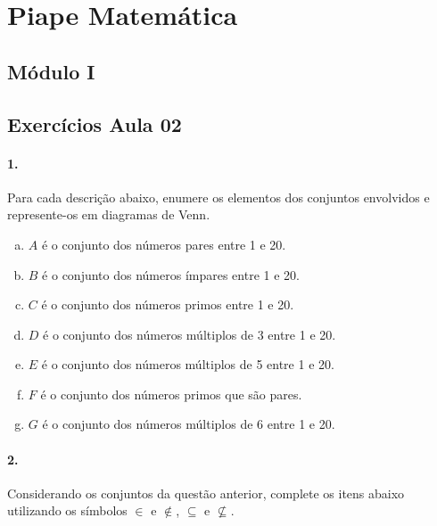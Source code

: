 \documentclass[a4paper,twocolumn,12pt]{article}
\begin{document}
 
\section*{Piape Matemática} 
 
\subsection*{Módulo I}
\subsection*{Exercícios Aula 02}
   
\paragraph*{1.} Para cada descrição abaixo, enumere os elementos dos conjuntos envolvidos e represente-os em diagramas de Venn.

\begin{enumerate}[a)]
\item  \(A\) é o conjunto dos números pares entre 1 e 20.
\item \(B\) é o conjunto dos números ímpares entre 1 e 20.
\item \(C\) é o conjunto dos números primos entre 1 e 20.
\item \(D\) é o conjunto dos números múltiplos de 3 entre 1 e 20.
\item \(E\) é o conjunto dos números múltiplos de 5 entre 1 e 20.
\item \(F\) é o conjunto dos números primos que são pares. 
\item \(G\) é o conjunto dos números múltiplos de 6 entre 1 e 20.
\end{enumerate}

\paragraph*{2.} Considerando os conjuntos da questão anterior, complete os itens abaixo utilizando os símbolos \(\in\) e \(\notin\), \(\subseteq\) e \(\not\subseteq\).

\medskip
\newcommand{\complete}{\underline{\hspace{7mm}} }
\end{document}
